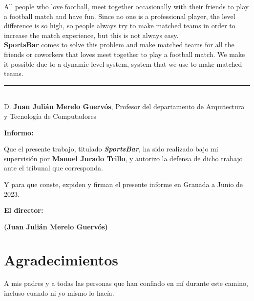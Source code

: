 All people who love football, meet together occasionally with their friends to play a football match and have fun.
Since no one is a professional player, the level difference is so high, so people always try to make matched teams in order to increase the match experience,
 but this is not always easy.\\

\textbf{SportsBar} comes to solve this problem and make matched teams for all the friends or coworkers that loves meet together to play a football match.
We make it possible due to a dynamic level system, system that we use to make matched teams.





\cleardoublepage

\thispagestyle{empty}

\noindent\rule[-1ex]{\textwidth}{2pt}\\[4.5ex]

D. \textbf{Juan Julián Merelo Guervós}, Profesor del departamento de Arquitectura y Tecnología de Computadores

\vspace{0.5cm}

\textbf{Informo:}

\vspace{0.5cm}

Que el presente trabajo, titulado \textit{\textbf{SportsBar}},
ha sido realizado bajo mi supervisión por \textbf{Manuel Jurado Trillo}, y autorizo la defensa de dicho trabajo ante el tribunal
que corresponda.

\vspace{0.5cm}

Y para que conste, expiden y firman el presente informe en Granada a Junio de 2023.

\vspace{1cm}

\textbf{El director: }

\vspace{5cm}

\noindent \textbf{(Juan Julián Merelo Guervós)}

\chapter*{Agradecimientos}

A mis padres y a todas las personas que han confiado en mí durante este camino, incluso cuando ni yo mismo lo hacía.




